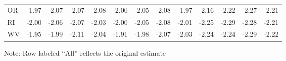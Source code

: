\begin{landscape}
\begin{table}
\begin{longtable}{lrrrr|rrrr|rrrr}
OR & -1.97 & -2.07 & -2.07 & -2.08 & -2.00 & -2.05 & -2.08 & -1.97 & -2.16 & -2.22 & -2.27 & -2.21 \\ 
RI & -2.00 & -2.06 & -2.07 & -2.03 & -2.00 & -2.05 & -2.08 & -2.01 & -2.25 & -2.29 & -2.28 & -2.21 \\ 
WV & -1.95 & -1.99 & -2.11 & -2.04 & -1.91 & -1.98 & -2.07 & -2.03 & -2.24 & -2.24 & -2.29 & -2.22 \\ 
 \hline
\end{longtable}
\begin{tablenotes}
  Note: Row labeled ``All'' reflects the original estimate
\end{tablenotes}
\end{table}
\end{landscape}

\clearpage
